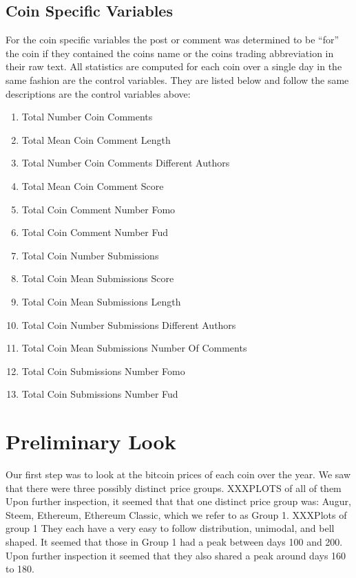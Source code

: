 \documentclass[12pt]{article}
\begin{document}
\subsection{Coin Specific Variables}


\indent For the coin specific variables the post or comment was determined to be ``for'' the coin if they contained the coins name or the coins trading abbreviation in their raw text. All statistics are computed for each coin over a single day in the same fashion are the control variables. They are listed below and follow the same descriptions are the control variables above:
\begin{multicols}{2}
\begin{enumerate}
\item Total Number Coin Comments
\item Total Mean Coin Comment Length
\item Total Number Coin Comments Different Authors
\item Total Mean Coin Comment Score
\item Total Coin Comment Number Fomo
\item Total Coin Comment Number Fud
\item Total Coin Number Submissions
\item Total Coin Mean Submissions Score
\item Total Coin Mean Submissions Length
\item Total Coin Number Submissions Different Authors
\item Total Coin Mean Submissions Number Of Comments
\item Total Coin Submissions Number Fomo
\item Total Coin Submissions Number Fud
\end{enumerate}
\end{multicols}

\section{Preliminary Look}
\indent Our first step was to look at the bitcoin prices of each coin over the year. We saw that there were three possibly distinct price groups. XXXPLOTS of all of them Upon further inspection, it seemed that that one distinct price group was: Augur, Steem, Ethereum, Ethereum Classic, which we refer to as Group 1. XXXPlots of group 1 They each have a very easy to follow distribution, unimodal, and bell shaped. It seemed that those in Group 1 had a peak between days 100 and 200. Upon further inspection it seemed that they also shared a peak around days 160 to 180. 
\end{document}
